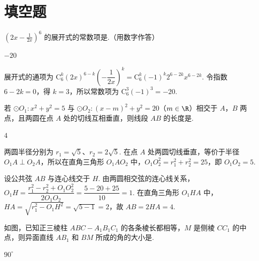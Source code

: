\section{填空题}

\begin{problem}
\(\left(2x - \frac{1}{2x}\right)^6\) 的展开式的常数项是\fillinblank{}.（用数字作答）
\end{problem}

\begin{answer}
\(-20\)
\end{answer}

\begin{solution}
展开式的通项为 \(\mathrm C_6^k(2x)^{6-k}\left(-\dfrac{1}{2x}\right)^k=\mathrm C_6^k(-1)^k2^{6-2k}x^{6-2k}\). 令指数 \(6-2k=0\)，得 \(k=3\)，所以常数项为 \(\mathrm C_6^3(-1)^3=-20\).
\end{solution}

\begin{problem}
若 \(\odot O_1: x^{2} + y^{2} = 5\) 与 \(\odot O_2: (x - m)^{2} + y^{2} = 20\)（\(m \in \R\)）相交于 \(A\)，\(B\) 两点，且两圆在点 \(A\) 处的切线互相垂直，则线段 \(AB\) 的长度是\fillinblank{}.
\end{problem}

\begin{answer}
\(4\)
\end{answer}

\begin{solution}
两圆半径分别为 \(r_1=\sqrt{5}\)、\(r_2=2\sqrt{5}\). 在点 \(A\) 处两圆切线垂直，等价于半径 \(O_1A\perp O_2A\)，所以在直角三角形 \(O_1AO_2\) 中，\(O_1O_2^2=r_1^2+r_2^2=25\)，即 \(O_1O_2=5\).

设公共弦 \(AB\) 与连心线交于 \(H\). 由两圆相交弦的连心线关系，\(O_1H=\dfrac{r_1^2-r_2^2+O_1O_2^2}{2O_1O_2}=\dfrac{5-20+25}{10}=1\). 在直角三角形 \(O_1HA\) 中，\(HA=\sqrt{r_1^2-O_1H^2}=\sqrt{5-1}=2\)，故 \(AB=2HA=4\).
\end{solution}

\begin{problem}
如图，已知正三棱柱 \(ABC - A_{1}B_{1}C_{1}\) 的各条棱长都相等，\(M\) 是侧棱 \(CC_{1}\) 的中点，则异面直线 \(AB_{1}\) 和 \(BM\) 所成的角的大小是\fillinblank{}.

\end{problem}

\begin{answer}
\(90^{\circ}\)
\end{answer}

